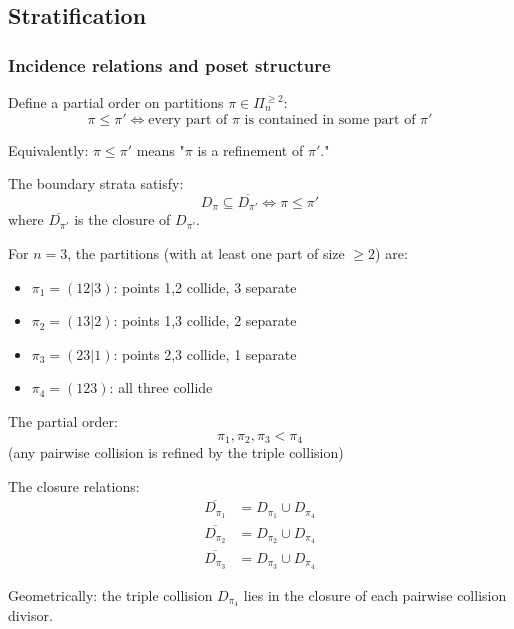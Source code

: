 \subsection{Stratification}

\subsubsection{Incidence relations and poset structure}

\begin{definition}\label{def:stratification-poset}
Define a partial order on partitions $\pi \in \Pi_n^{\geq 2}$:
\[\pi \leq \pi' \iff \text{every part of } \pi \text{ is contained in some part of } \pi'\]

Equivalently: $\pi \leq \pi'$ means "$\pi$ is a refinement of $\pi'$."

The boundary strata satisfy:
\[D_\pi \subseteq \overline{D_{\pi'}} \iff \pi \leq \pi'\]
where $\overline{D_{\pi'}}$ is the closure of $D_{\pi'}$.
\end{definition}

\begin{example}[Poset for \texorpdfstring{$n=3$}{n=3}]\label{ex:poset-n3}
For $n=3$, the partitions (with at least one part of size $\geq 2$) are:
\begin{itemize}
\item $\pi_1 = (12|3)$: points 1,2 collide, 3 separate
\item $\pi_2 = (13|2)$: points 1,3 collide, 2 separate  
\item $\pi_3 = (23|1)$: points 2,3 collide, 1 separate
\item $\pi_4 = (123)$: all three collide
\end{itemize}

The partial order:
\[\pi_1, \pi_2, \pi_3 < \pi_4\]
(any pairwise collision is refined by the triple collision)

The closure relations:
\begin{align*}
\overline{D_{\pi_1}} &= D_{\pi_1} \cup D_{\pi_4} \\
\overline{D_{\pi_2}} &= D_{\pi_2} \cup D_{\pi_4} \\
\overline{D_{\pi_3}} &= D_{\pi_3} \cup D_{\pi_4}
\end{align*}

Geometrically: the triple collision $D_{\pi_4}$ lies in the closure of each pairwise collision divisor.
\end{example}

